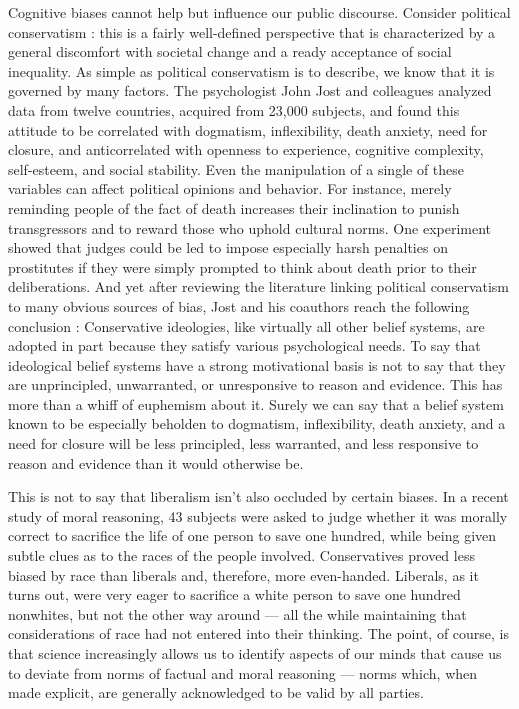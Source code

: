 \documentclass[a4paper,14pt]{extbook}
\begin{document}
Cognitive biases cannot help but influence our public discourse.
Consider political conservatism :
this is a fairly well-defined perspective that is characterized by a general discomfort with societal change and a ready acceptance of social inequality.
As simple as political conservatism is to describe, we know that it is governed by many factors.
The psychologist John Jost and colleagues analyzed data from twelve countries, acquired from 23,000 subjects, and found this attitude to be correlated with dogmatism, inflexibility, death anxiety, need for closure, and anticorrelated with openness to experience, cognitive complexity, self-esteem, and social stability.
Even the manipulation of a single of these variables can affect political opinions and behavior.
For instance, merely reminding people of the fact of death increases their inclination to punish transgressors and to reward those who uphold cultural norms.
One experiment showed that judges could be led to impose especially harsh penalties on prostitutes if they were simply prompted to think about death prior to their deliberations.
And yet after reviewing the literature linking political conservatism to many obvious sources of bias, Jost and his coauthors reach the following conclusion :
Conservative ideologies, like virtually all other belief systems, are adopted in part because they satisfy various psychological needs.
To say that ideological belief systems have a strong motivational basis is not to say that they are unprincipled, unwarranted, or unresponsive to reason and evidence.
This has more than a whiff of euphemism about it.
Surely we can say that a belief system known to be especially beholden to dogmatism, inflexibility, death anxiety, and a need for closure will be less principled, less warranted, and less responsive to reason and evidence than it would otherwise be.

This is not to say that liberalism isn’t also occluded by certain biases.
In a recent study of moral reasoning, 43 subjects were asked to judge whether it was morally correct to sacrifice the life of one person to save one hundred, while being given subtle clues as to the races of the people involved.
Conservatives proved less biased by race than liberals and, therefore, more even-handed.
Liberals, as it turns out, were very eager to sacrifice a white person to save one hundred nonwhites, but not the other way around --- all the while maintaining that considerations of race had not entered into their thinking.
The point, of course, is that science increasingly allows us to identify aspects of our minds that cause us to deviate from norms of factual and moral reasoning --- norms which, when made explicit, are generally acknowledged to be valid by all parties.
\end{document}
